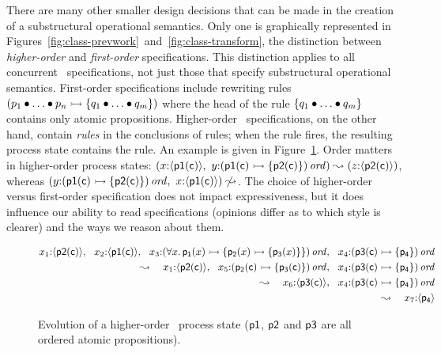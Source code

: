 There are many other smaller design decisions that can be made in the
creation of a substructural operational semantics. Only one is
graphically represented in
Figures~\ref{fig:class-prevwork}~and~\ref{fig:class-transform}, the
distinction between {\it higher-order} and {\it first-order}
specifications. This distinction applies to all concurrent
\sls~specifications, not just those that specify substructural
operational semantics. First-order
specifications include rewriting rules $\left( p_1 \mathbin{\bullet} \ldots \mathbin{\bullet}
  p_n \rightarrowtail \{ q_1 \mathbin{\bullet} \ldots \mathbin{\bullet} q_m \} \right)$ where the head
of the rule $\{ q_1 \mathbin{\bullet} \ldots \mathbin{\bullet} q_m \}$ contains only atomic
propositions. Higher-order \sls~specifications, on the other hand,
contain {\it rules} in the conclusions of rules; when the rule fires,
the resulting process state contains the rule. An example is given 
in Figure~\ref{fig:ho-evo-ex}.
Order matters in higher-order process states: $\left(x{:}\langle {\sf p1(c)} \rangle, ~
y{:}{\left( {\sf p1(c)} \rightarrowtail \{ {\sf p2(c)} \} \right)}\,{{\it ord}}\right)
\leadsto \left(z{:}\langle {\sf p2(c)} \rangle\right)$, whereas 
$\left(y{:}{\left( {\sf p1(c)} \rightarrowtail \{ {\sf p2(c)} \} \right)}\,{{\it ord}},~
x{:}\langle {\sf p1(c)} \rangle\right)
\not \leadsto$. 
%
The choice of higher-order versus first-order specification does not
impact expressiveness, but it does influence our ability to read
specifications (opinions differ as to which style is clearer) and 
the ways we reason about them.

\begin{figure}
\begin{align*}
x_1{:}\langle {{\sf p2}({\sf c})} \rangle, ~~
x_2{:}\langle {{\sf p1}({\sf c})} \rangle, ~~
x_3{:}{(\forall x.\,{\sf p_1}(x) 
                \rightarrowtail \{ {\sf p_2}(x) \rightarrowtail \{ {\sf p_3}(x) \} \})}\,{{\it ord}}, ~~
x_4{:}{({\sf p3}({\sf c}) \rightarrowtail \{ {\sf p_4} \})}\,{{\it ord}} & \\
\leadsto ~~~ 
x_1{:}\langle {{\sf p2}({\sf c})} \rangle, ~~
x_5{:}{({\sf p_2}({\sf c}) \rightarrowtail \{ {\sf p_3}({\sf c}) \})}\,{{\it ord}}, ~~
x_4{:}{({\sf p3}({\sf c}) \rightarrowtail \{ {\sf p_4} \})}\,{{\it ord}} & \\
\leadsto ~~~ 
x_6{:}\langle {{\sf p3}({\sf c})} \rangle, ~~
x_4{:}{({\sf p3}({\sf c}) \rightarrowtail \{ {\sf p_4} \})}\,{{\it ord}} & \\
\leadsto ~~~ 
x_7{:}\langle {{\sf p_4}} \rangle & 
\end{align*}
\caption{Evolution of a higher-order \sls~process state (${\sf p1}$, ${\sf
  p2}$ and ${\sf p3}$ are all ordered atomic propositions).}
\label{fig:ho-evo-ex}
\end{figure}

